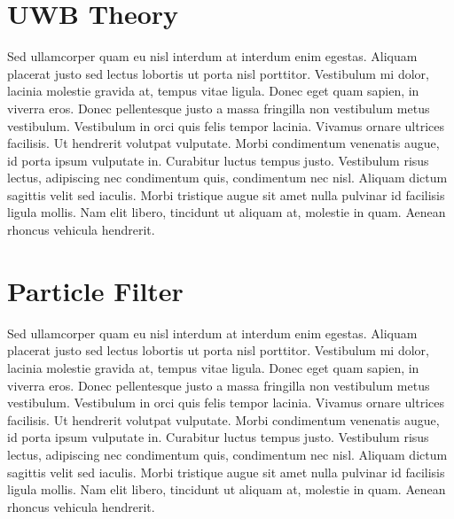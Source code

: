 \section{UWB Theory}

Sed ullamcorper quam eu nisl interdum at interdum enim egestas. Aliquam placerat justo sed lectus lobortis ut porta nisl porttitor. Vestibulum mi dolor, lacinia molestie gravida at, tempus vitae ligula. Donec eget quam sapien, in viverra eros. Donec pellentesque justo a massa fringilla non vestibulum metus vestibulum. Vestibulum in orci quis felis tempor lacinia. Vivamus ornare ultrices facilisis. Ut hendrerit volutpat vulputate. Morbi condimentum venenatis augue, id porta ipsum vulputate in. Curabitur luctus tempus justo. Vestibulum risus lectus, adipiscing nec condimentum quis, condimentum nec nisl. Aliquam dictum sagittis velit sed iaculis. Morbi tristique augue sit amet nulla pulvinar id facilisis ligula mollis. Nam elit libero, tincidunt ut aliquam at, molestie in quam. Aenean rhoncus vehicula hendrerit.


\section{Particle Filter}

Sed ullamcorper quam eu nisl interdum at interdum enim egestas. Aliquam placerat justo sed lectus lobortis ut porta nisl porttitor. Vestibulum mi dolor, lacinia molestie gravida at, tempus vitae ligula. Donec eget quam sapien, in viverra eros. Donec pellentesque justo a massa fringilla non vestibulum metus vestibulum. Vestibulum in orci quis felis tempor lacinia. Vivamus ornare ultrices facilisis. Ut hendrerit volutpat vulputate. Morbi condimentum venenatis augue, id porta ipsum vulputate in. Curabitur luctus tempus justo. Vestibulum risus lectus, adipiscing nec condimentum quis, condimentum nec nisl. Aliquam dictum sagittis velit sed iaculis. Morbi tristique augue sit amet nulla pulvinar id facilisis ligula mollis. Nam elit libero, tincidunt ut aliquam at, molestie in quam. Aenean rhoncus vehicula hendrerit.